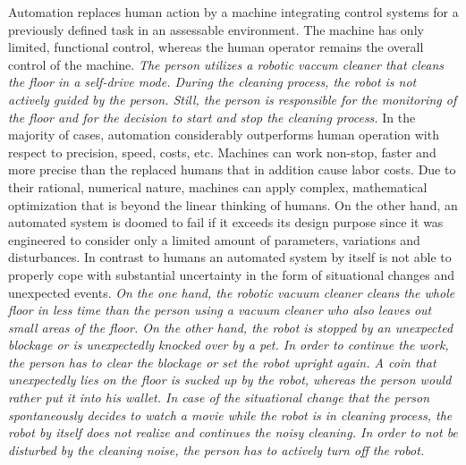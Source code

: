 Automation replaces human action by a machine integrating 
control systems for a previously defined task in an assessable environment.
The machine has only limited, functional control, whereas the human operator remains the overall control of the machine.
\textit{The person utilizes a robotic vaccum cleaner that cleans the floor in a self-drive mode.
During the cleaning process, the robot is not actively guided by the person. 
Still, the person is responsible for the monitoring of the floor and for the decision to start and stop the cleaning process.}
In the majority of cases, automation considerably outperforms human operation with respect to precision, speed, costs, etc.
Machines can work non-stop, faster and more precise than the replaced humans that in addition cause labor costs.
Due to their rational, numerical nature, machines can apply complex, mathematical optimization that is beyond the linear thinking of humans.
On the other hand, an automated system is doomed to fail if it exceeds its design purpose since
it was engineered to consider only a limited amount of parameters, variations and disturbances.
In contrast to humans an automated system by itself is not able to properly cope with substantial uncertainty in the form
of situational changes and unexpected events.
\textit{On the one hand, the robotic vacuum cleaner cleans the whole floor in less time than the person using a vacuum cleaner 
who also leaves out small areas of the floor. 
On the other hand, the robot is stopped by an unexpected blockage or is unexpectedly knocked over by a pet.
In order to continue the work, the person has to clear the blockage or set the robot upright again.
A coin that unexpectedly lies on the floor is sucked up by the robot, whereas the person would rather put it into his wallet.
In case of the situational change
that the person spontaneously decides to watch a movie while the robot is in cleaning process,
the robot by itself does not realize and continues the noisy cleaning.
In order to not be disturbed by the cleaning noise, the person has to actively turn off the robot.}

